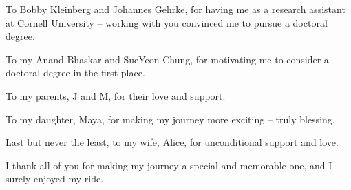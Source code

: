 To Bobby Kleinberg and Johannes Gehrke, for having me as a research assistant at Cornell University -- working with you convinced me to pursue a doctoral degree.

To my Anand Bhaskar and SueYeon Chung, for motivating me to consider a doctoral degree in the first place.

To my parents, J and M, for their love and support.

To my daughter, Maya, for making my journey more exciting -- truly blessing.

Last but never the least, to my wife, Alice, for unconditional support and love.

I thank all of you for making my journey a special and memorable one, and I surely enjoyed my ride.


